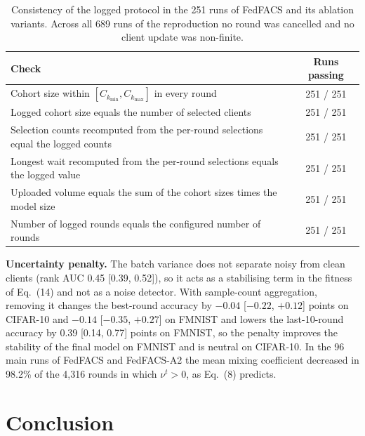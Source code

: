 \documentclass[pdflatex,sn-mathphys-num,oneside]{sn-jnl}%
\theoremstyle{thmstyleone}%
\theoremstyle{thmstyletwo}%
\theoremstyle{thmstylethree}%
\newlength{\journalfloatwidth}
\begin{document}
\begin{table}[!htbp]
\centering
\footnotesize
\setlength{\tabcolsep}{3pt}
\renewcommand{\arraystretch}{1.08}
\caption{Consistency of the logged protocol in the 251 runs of FedFACS and its ablation variants. Across all 689 runs of the reproduction no round was cancelled and no client update was non-finite.}
\label{tab:audit}
\begin{tabular*}{\journalfloatwidth}{@{\extracolsep{\fill}}lc@{}}
\toprule
Check & Runs passing \\
\midrule
Cohort size within $[C_{k_{\min}},C_{k_{\max}}]$ in every round & 251 / 251 \\
Logged cohort size equals the number of selected clients & 251 / 251 \\
Selection counts recomputed from the per-round selections equal the logged counts & 251 / 251 \\
Longest wait recomputed from the per-round selections equals the logged value & 251 / 251 \\
Uploaded volume equals the sum of the cohort sizes times the model size & 251 / 251 \\
Number of logged rounds equals the configured number of rounds & 251 / 251 \\
\bottomrule
\end{tabular*}
\end{table}

\textbf{Uncertainty penalty.} The batch variance does not separate noisy from clean clients (rank AUC 0.45 [0.39, 0.52]), so it acts as a stabilising term in the fitness of Eq.~(14) and not as a noise detector. With sample-count aggregation, removing it changes the best-round accuracy by $-0.04$ [$-0.22$, $+0.12$] points on CIFAR-10 and $-0.14$ [$-0.35$, $+0.27$] on FMNIST and lowers the last-10-round accuracy by 0.39 [0.14, 0.77] points on FMNIST, so the penalty improves the stability of the final model on FMNIST and is neutral on CIFAR-10. In the 96 main runs of FedFACS and FedFACS-A2 the mean mixing coefficient decreased in 98.2\% of the 4,316 rounds in which $\nu^t>0$, as Eq.~(8) predicts.

\section{Conclusion}
\label{sec:conclusion}
\end{document}
